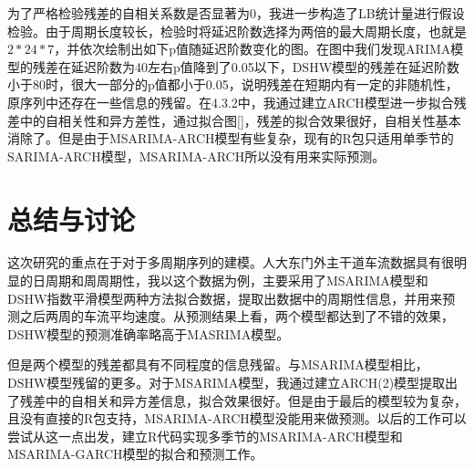 \documentclass[lang=cn,11pt,a4paper]{elegantpaper}
\begin{document}
为了严格检验残差的自相关系数是否显著为0，我进一步构造了LB统计量进行假设检验。由于周期长度较长，检验时将延迟阶数选择为两倍的最大周期长度，也就是$2*24*7$，并依次绘制出如下p值随延迟阶数变化的图。在图中我们发现ARIMA模型的残差在延迟阶数为40左右p值降到了0.05以下，DSHW模型的残差在延迟阶数小于80时，很大一部分的p值都小于0.05，说明残差在短期内有一定的非随机性，原序列中还存在一些信息的残留。在4.3.2中，我通过建立ARCH模型进一步拟合残差中的自相关性和异方差性，通过拟合图[]，残差的拟合效果很好，自相关性基本消除了。但是由于MSARIMA-ARCH模型有些复杂，现有的R包只适用单季节的SARIMA-ARCH模型，MSARIMA-ARCH所以没有用来实际预测。


\section{总结与讨论}
这次研究的重点在于对于多周期序列的建模。人大东门外主干道车流数据具有很明显的日周期和周周期性，我以这个数据为例，主要采用了MSARIMA模型和DSHW指数平滑模型两种方法拟合数据，提取出数据中的周期性信息，并用来预测之后两周的车流平均速度。从预测结果上看，两个模型都达到了不错的效果，DSHW模型的预测准确率略高于MASRIMA模型。

但是两个模型的残差都具有不同程度的信息残留。与MSARIMA模型相比，DSHW模型残留的更多。对于MSARIMA模型，我通过建立ARCH(2)模型提取出了残差中的自相关和异方差信息，拟合效果很好。但是由于最后的模型较为复杂，且没有直接的R包支持，MSARIMA-ARCH模型没能用来做预测。以后的工作可以尝试从这一点出发，建立R代码实现多季节的MSARIMA-ARCH模型和MSARIMA-GARCH模型的拟合和预测工作。

\nocite{*}

\end{document}
